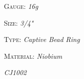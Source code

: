 \documentclass[8pt]{article}
\date{\today}
\title{}
\begin{document}
{\textsc{Gauge}}:      {\scriptsize\textit{16g}}

{\textsc{Size}}:      {\scriptsize\textit{3/4"}}

{\textsc{Type}}:      {\scriptsize\textit{Captive Bead Ring}}

{\textsc{Material}}:      {\scriptsize\textit{Niobium}}

{\scriptsize\textit{CJ1002}}
\end{document}
